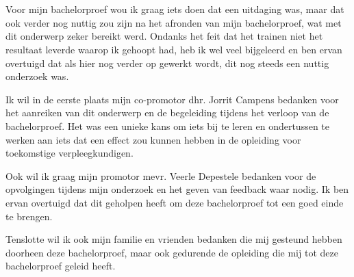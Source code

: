 
\chapter*{}%
\label{ch:voorwoord}


Voor mijn bachelorproef wou ik graag iets doen dat een uitdaging was, maar dat ook verder nog nuttig zou zijn na het afronden van mijn bachelorproef, wat met dit onderwerp zeker bereikt werd. Ondanks het feit dat het trainen niet het resultaat leverde waarop ik gehoopt had, heb ik wel veel bijgeleerd en ben ervan overtuigd dat als hier nog verder op gewerkt wordt, dit nog steeds een nuttig onderzoek was.

Ik wil in de eerste plaats mijn co-promotor dhr. Jorrit Campens bedanken voor het aanreiken van dit onderwerp en de begeleiding tijdens het verloop van de bachelorproef. Het was een unieke kans om iets bij te leren en ondertussen te werken aan iets dat een effect zou kunnen hebben in de opleiding voor toekomstige verpleegkundigen.

Ook wil ik graag mijn promotor mevr. Veerle Depestele bedanken voor de opvolgingen tijdens mijn onderzoek en het geven van feedback waar nodig. Ik ben ervan overtuigd dat dit geholpen heeft om deze bachelorproef tot een goed einde te brengen.

Tenslotte wil ik ook mijn familie en vrienden bedanken die mij gesteund hebben doorheen deze bachelorproef, maar ook gedurende de opleiding die mij tot deze bachelorproef geleid heeft.